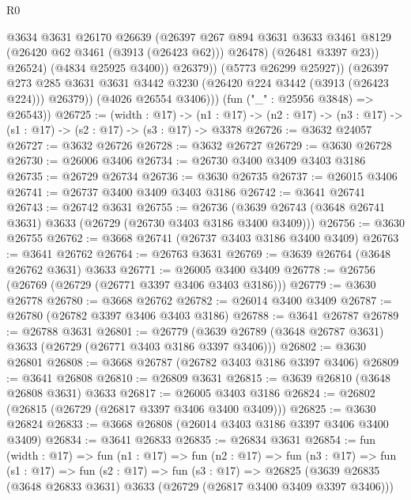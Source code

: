 \begin{lexlean}{R0}
\begin{coremodule}
                        @3634
                        @3631
                        @26170
                        @26639
                        (@26397
                          @267
                          @894
                          @3631
                          @3633
                          @3461
                          @8129
                          (@26420 @62 @3461 (@3913 (@26423 @62)))
                          @26478)
                        (@26481 @3397 @23))
                      @26524)
                    (@4834 @25925 @3400))
                  @26379))
              (@5773 @26299 @25927))
            (@26397
              @273
              @285
              @3631
              @3631
              @3442
              @3230
              (@26420 @224 @3442 (@3913 (@26423 @224)))
              @26379))
          (@4026 @26554 @3406)))
      (fun ("_" : @25956 @3848) => @26543))
@26725 := (width : @17) ->
  (n1 : @17) -> (n2 : @17) -> (n3 : @17) -> (s1 : @17) -> (s2 : @17) -> (s3 : @17) -> @3378
@26726 := @3632 @24057
@26727 := @3632 @26726
@26728 := @3632 @26727
@26729 := @3630 @26728
@26730 := @26006 @3406
@26734 := @26730 @3400 @3409 @3403 @3186
@26735 := @26729 @26734
@26736 := @3630 @26735
@26737 := @26015 @3406
@26741 := @26737 @3400 @3409 @3403 @3186
@26742 := @3641 @26741
@26743 := @26742 @3631
@26755 := @26736 (@3639 @26743 (@3648 @26741 @3631) @3633 (@26729 (@26730 @3403 @3186 @3400 @3409)))
@26756 := @3630 @26755
@26762 := @3668 @26741 (@26737 @3403 @3186 @3400 @3409)
@26763 := @3641 @26762
@26764 := @26763 @3631
@26769 := @3639 @26764 (@3648 @26762 @3631) @3633
@26771 := @26005 @3400 @3409
@26778 := @26756 (@26769 (@26729 (@26771 @3397 @3406 @3403 @3186)))
@26779 := @3630 @26778
@26780 := @3668 @26762
@26782 := @26014 @3400 @3409
@26787 := @26780 (@26782 @3397 @3406 @3403 @3186)
@26788 := @3641 @26787
@26789 := @26788 @3631
@26801 := @26779 (@3639 @26789 (@3648 @26787 @3631) @3633 (@26729 (@26771 @3403 @3186 @3397 @3406)))
@26802 := @3630 @26801
@26808 := @3668 @26787 (@26782 @3403 @3186 @3397 @3406)
@26809 := @3641 @26808
@26810 := @26809 @3631
@26815 := @3639 @26810 (@3648 @26808 @3631) @3633
@26817 := @26005 @3403 @3186
@26824 := @26802 (@26815 (@26729 (@26817 @3397 @3406 @3400 @3409)))
@26825 := @3630 @26824
@26833 := @3668 @26808 (@26014 @3403 @3186 @3397 @3406 @3400 @3409)
@26834 := @3641 @26833
@26835 := @26834 @3631
@26854 := fun (width : @17) =>
  fun (n1 : @17) =>
  fun (n2 : @17) =>
  fun (n3 : @17) =>
  fun (s1 : @17) =>
  fun (s2 : @17) =>
  fun (s3 : @17) =>
  @26825 (@3639 @26835 (@3648 @26833 @3631) @3633 (@26729 (@26817 @3400 @3409 @3397 @3406)))

\end{coremodule}
\end{lexlean}
